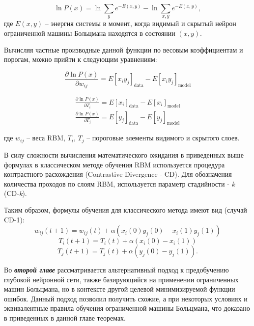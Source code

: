 \documentclass{thesisby}
\begin{document}
\begin{equation*}
    \ln{P(x)} = \ln{\sum_y e^{-E(x, y)}} - \ln{\sum_{x,y} e^{-E(x, y)}},
\end{equation*}
где $E(x, y)$ -- энергия системы в момент, когда видимый и скрытый нейрон ограниченной машины Больцмана находятся в состоянии $(x, y)$.
	
Вычисляя частные производные данной функции по весовым коэффициентам и порогам, можно прийти к следующим уравнениям:

\begin{equation*}
    \label{grad_weights}
	\frac{\partial \ln P(x)}{\partial w_{ij}}=E\left[x_iy_j\right]_{\text{data}}-E\left[x_iy_j\right]_{\text{model}}
\end{equation*}
 
\begin{equation*}
\label{grad_biases}
\begin{aligned}
	\frac{\partial \ln P(x)}{\partial T_i}=E\left[x_i\right]_{\text{data}}-E\left[x_i\right]_{\text{model}}\\
	\frac{\partial \ln P(x)}{\partial T_j}=E\left[y_j\right]_{\text{data}}-E\left[y_j\right]_{\text{model}}
\end{aligned}
\end{equation*}

где $w_{ij}$ -- веса RBM, $T_i$, $T_j$ -- пороговые элементы видимого и скрытого слоев.

В силу сложности вычисления математического ожидания в приведенных выше формулах в классическом методе обучения RBM используется процедура контрастного расхождения (Contrastive Divergence - CD). Для обозначения количества проходов по слоям RBM, используется параметр стадийности - \textit{k} (CD-\textit{k}).

Таким образом, формулы обучения для классического метода имеют вид (случай CD-1):
\begin{equation*}
	w_{ij}(t+1)=w_{ij}(t)+\alpha(x_i(0)y_j(0)-x_i(1)y_j(1))
\end{equation*}
\begin{equation*}
    T_i(t+1)=T_i(t)+\alpha(x_i(0)-x_i(1))
\end{equation*}
\begin{equation*}
    T_j(t+1)=T_j(t)+\alpha(y_j(0)-y_j(1)).
\end{equation*}
 
Во \textbf{\textit{второй главе}} рассматривается альтернативный подход к предобучению глубокой нейронной сети, также базирующийся на применении ограниченных машин Больцмана, но в контексте другой целевой минимизируемой функции ошибок. Данный подход позволил получить схожие, а при некоторых условиях и эквивалентные правила обучения ограниченной машины Больцмана, что доказано в приведенных в данной главе теоремах.
	
\end{document}
